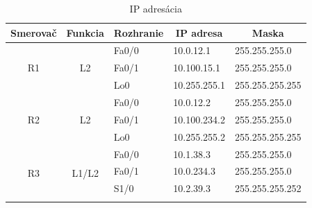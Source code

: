 \documentclass[12pt,twoside,a4paper]{report}
\begin{document}
\begin{table}[!htb]
\centering
\caption{IP adresácia}
\label{tab:ip_adresacia}
\begin{tabular}{|c|c|l|l|l|}
\hline
\multicolumn{1}{|c|}{\textbf{Smerovač}}    & \multicolumn{1}{c|}{\textbf{Funkcia}}                        & \multicolumn{1}{c|}{\textbf{Rozhranie}} & \multicolumn{1}{c|}{\textbf{IP adresa}} & \multicolumn{1}{c|}{\textbf{Maska}} \\ \hline
\multirow{3}{*}{R1}  & \multirow{3}{*}{L2}                   & Fa0/0                                   & 10.0.12.1                               & 255.255.255.0                       \\ \cline{3-5} 
                     &                                         & Fa0/1                                   & 10.100.15.1                             & 255.255.255.0                       \\ \cline{3-5} 
                     &                                         & Lo0                                     & 10.255.255.1                            & 255.255.255.255                     \\ \hline
\multirow{3}{*}{R2}  & \multirow{3}{*}{L2}             & Fa0/0                                   & 10.0.12.2                               & 255.255.255.0                       \\ \cline{3-5} 
                     &                                         & Fa0/1                                   & 10.100.234.2                             & 255.255.255.0                       \\ \cline{3-5}
                     &                                         & Lo0                                     & 10.255.255.2                            & 255.255.255.255                     \\ \hline
\multirow{4}{*}{R3}  & \multirow{4}{*}{L1/L2}                    & Fa0/0                                   & 10.1.38.3                               & 255.255.255.0                       \\ \cline{3-5} 
                     &                                         & Fa0/1                                   & 10.0.234.3                              & 255.255.255.0                       \\ \cline{3-5} 
                     &                                         & S1/0                                    & 10.2.39.3                               & 255.255.255.252                     \\ \cline{3-5} 

\end{tabular}
\end{table}
\end{document}
